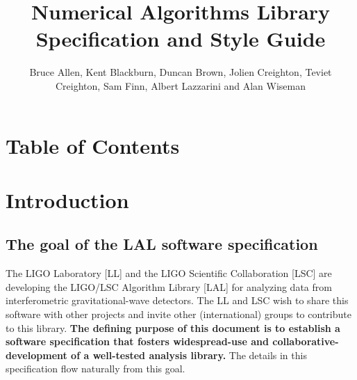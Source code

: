 \documentclass[]{ligodcc}
\title{Numerical Algorithms Library
Specification and Style Guide}
\author{Bruce Allen, Kent Blackburn, Duncan Brown, Jolien Creighton, Teviet
Creighton, Sam Finn, Albert Lazzarini and  Alan Wiseman}
\begin{document}
\maketitle

\section{Table of Contents}
\tableofcontents
\listoftables
\clearpage


\section{Introduction}
\label{introduction}

\subsection{The goal of the  LAL software specification}

The LIGO Laboratory [LL] and  the LIGO Scientific Collaboration [LSC]
are  developing  the LIGO/LSC Algorithm Library [LAL] for analyzing
data from interferometric gravitational-wave detectors.  The LL and
LSC wish to share this software with other projects and invite other
(international) groups  to contribute to this library.  {\bf The defining
purpose of this document is to establish a software specification that
fosters widespread-use and  collaborative-development  of  a
well-tested analysis  library.} The details in this specification flow
naturally from this goal.
\end{document}
